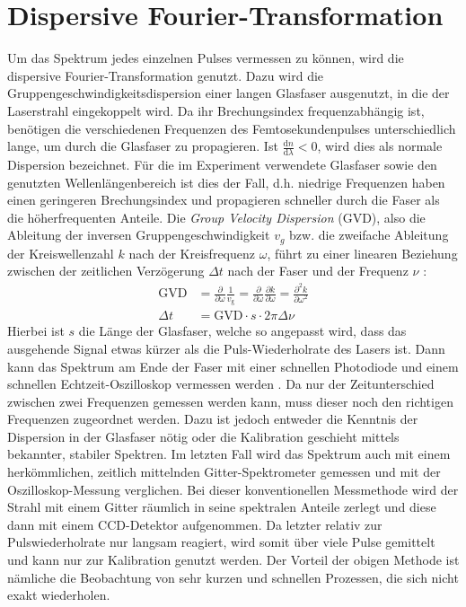 \documentclass[bachelor,       %
               twoside,        %
               BCOR10mm,       %
               liststotoc,nomtotoc,bibtotoc, %
               english,ngerman, %
               final,          %
               ]{GAUBM}
\newcommand{\dif}{\ensuremath{\mathrm{d}}}
\begin{document}
\section{Dispersive Fourier-Transformation}
\label{sec:DFT}
Um das Spektrum jedes einzelnen Pulses vermessen zu können, wird die dispersive Fourier-Transformation genutzt.
Dazu wird die Gruppengeschwindigkeitsdispersion einer langen Glasfaser ausgenutzt, in die der Laserstrahl eingekoppelt wird.
Da ihr Brechungsindex frequenzabhängig ist, benötigen die verschiedenen Frequenzen des Femtosekundenpulses unterschiedlich lange, um durch die Glasfaser zu propagieren.
Ist $\frac{\dif n}{\dif \lambda}<0$, wird dies als normale Dispersion bezeichnet.
Für die im Experiment verwendete Glasfaser sowie den genutzten Wellenlängenbereich ist dies der Fall, d.h. niedrige Frequenzen haben einen geringeren Brechungsindex und propagieren schneller durch die Faser als die höherfrequenten Anteile.
Die \textit{Group Velocity Dispersion} (GVD), also die Ableitung der inversen Gruppengeschwindigkeit $v_g$ bzw. die zweifache Ableitung der Kreiswellenzahl $k$ nach der Kreisfrequenz $\omega$, führt zu einer linearen Beziehung zwischen der zeitlichen Verzögerung $\Delta t$ nach der Faser und der Frequenz $\nu$ \cite[S. 9 ff.]{agrawal_nonlinear_2001}:
\begin{align}
	\text{GVD}&=\frac{\partial}{\partial \omega}\frac{1}{v_\text{g}}=\frac{\partial}{\partial \omega}\frac{\partial k}{\partial \omega}=\frac{\partial^2 k}{\partial\omega^2}\\
	\Delta t&=\text{GVD} \cdot s \cdot 2\pi\Delta\nu
\end{align}
Hierbei ist $s$ die Länge der Glasfaser, welche so angepasst wird, dass das ausgehende Signal etwas kürzer als die Puls-Wiederholrate des Lasers ist.
Dann kann das Spektrum am Ende der Faser mit einer schnellen Photodiode und einem schnellen Echtzeit-Oszilloskop vermessen werden \cite{goda_dispersive_2013}.
Da nur der Zeitunterschied zwischen zwei Frequenzen gemessen werden kann, muss dieser noch den richtigen Frequenzen zugeordnet werden.
Dazu ist jedoch entweder die Kenntnis der Dispersion in der Glasfaser nötig oder die Kalibration geschieht mittels bekannter, stabiler Spektren.
Im letzten Fall wird das Spektrum auch mit einem herkömmlichen, zeitlich mittelnden Gitter-Spektrometer gemessen und mit der Oszilloskop-Messung verglichen.
Bei dieser konventionellen Messmethode wird der Strahl mit einem Gitter räumlich in seine spektralen Anteile zerlegt und diese dann mit einem CCD-Detektor aufgenommen.
Da letzter relativ zur Pulswiederholrate nur langsam reagiert, wird somit über viele Pulse gemittelt und kann nur zur Kalibration genutzt werden.
Der Vorteil der obigen Methode ist nämliche die Beobachtung von sehr kurzen und schnellen Prozessen, die sich nicht exakt wiederholen.
\end{document}
